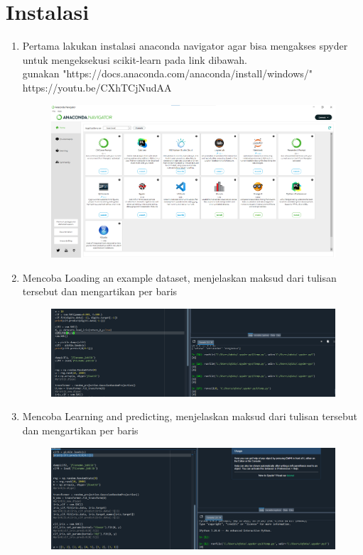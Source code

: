 \section{Instalasi}
\begin{enumerate}
\item
Pertama lakukan instalasi anaconda navigator agar bisa mengakses spyder untuk mengeksekusi scikit-learn pada link dibawah.\\
gunakan "https://docs.anaconda.com/anaconda/install/windows/"\\
https://youtu.be/CXhTCjNudAA

\begin{figure}[!htbp]
    \centering
    \includegraphics[scale=0.4]{figures/5.png}
    \end{figure}

\item
Mencoba Loading an example dataset, menjelaskan maksud dari tulisan tersebut dan mengartikan per baris
\begin{figure}[!htbp]
    \centering
    \includegraphics[scale=0.4]{figures/2.png}
    \end{figure}

\newpage
\item
Mencoba Learning and predicting, menjelaskan maksud dari tulisan tersebut dan mengartikan per baris
\begin{figure}[!htbp]
    \centering
    \includegraphics[scale=0.4]{figures/3.png}
    \end{figure}



\end{enumerate}
